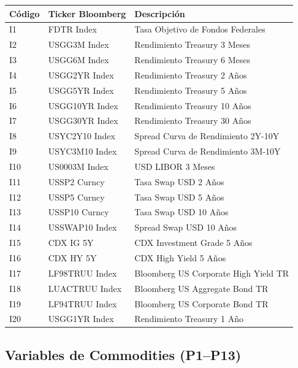 \documentclass[11pt,a4paper]{article}
\begin{document}
\small
\begin{longtable}{lp{3.5cm}p{7.5cm}}
\toprule
\textbf{Código} & \textbf{Ticker Bloomberg} & \textbf{Descripción} \\
\midrule
\endhead
I1 & FDTR Index & Tasa Objetivo de Fondos Federales \\
I2 & USGG3M Index & Rendimiento Treasury 3 Meses \\
I3 & USGG6M Index & Rendimiento Treasury 6 Meses \\
I4 & USGG2YR Index & Rendimiento Treasury 2 Años \\
I5 & USGG5YR Index & Rendimiento Treasury 5 Años \\
I6 & USGG10YR Index & Rendimiento Treasury 10 Años \\
I7 & USGG30YR Index & Rendimiento Treasury 30 Años \\
I8 & USYC2Y10 Index & Spread Curva de Rendimiento 2Y-10Y \\
I9 & USYC3M10 Index & Spread Curva de Rendimiento 3M-10Y \\
I10 & US0003M Index & USD LIBOR 3 Meses \\
I11 & USSP2 Curncy & Tasa Swap USD 2 Años \\
I12 & USSP5 Curncy & Tasa Swap USD 5 Años \\
I13 & USSP10 Curncy & Tasa Swap USD 10 Años \\
I14 & USSWAP10 Index & Spread Swap USD 10 Años \\
I15 & CDX IG 5Y & CDX Investment Grade 5 Años \\
I16 & CDX HY 5Y & CDX High Yield 5 Años \\
I17 & LF98TRUU Index & Bloomberg US Corporate High Yield TR \\
I18 & LUACTRUU Index & Bloomberg US Aggregate Bond TR \\
I19 & LF94TRUU Index & Bloomberg US Corporate Bond TR \\
I20 & USGG1YR Index & Rendimiento Treasury 1 Año \\
\bottomrule
\end{longtable}
\normalsize

\subsection{Variables de Commodities (P1--P13)}
\end{document}
